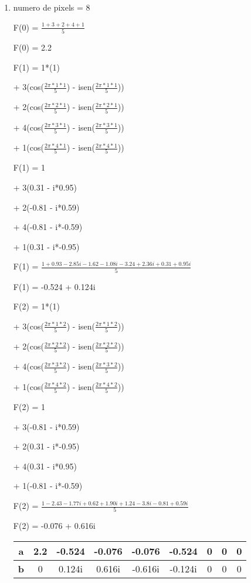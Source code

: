 \begin{question}
\begin{enumerate}[label=\textbf{\alph*})]
  \item 

  numero de pixels = 8

  F(0) = $\frac{1 + 3 + 2 + 4 + 1}{5}$

  F(0) = 2.2

  F(1) = 1*(1) 

  + 3(cos($\frac{2\pi*1*1}{5}$) - isen($\frac{2\pi*1*1}{5}$))
  
  + 2(cos($\frac{2\pi*2*1}{5}$) - isen($\frac{2\pi*2*1}{5}$))

  + 4(cos($\frac{2\pi*3*1}{5}$) - isen($\frac{2\pi*3*1}{5}$))

  + 1(cos($\frac{2\pi*4*1}{5}$) - isen($\frac{2\pi*4*1}{5}$)) 

  F(1) = 1

  + 3(0.31 - i*0.95)
  
  + 2(-0.81 - i*0.59)

  + 4(-0.81 - i*-0.59)

  + 1(0.31 - i*-0.95) 

  F(1) = $\frac{1 + 0.93 - 2.85i -1.62 -1.08i -3.24 + 2.36i + 0.31 +0.95i}{5}$

  F(1) = -0.524 + 0.124i

  F(2) = 1*(1) 

  + 3(cos($\frac{2\pi*1*2}{5}$) - isen($\frac{2\pi*1*2}{5}$))
  
  + 2(cos($\frac{2\pi*2*2}{5}$) - isen($\frac{2\pi*2*2}{5}$))

  + 4(cos($\frac{2\pi*3*2}{5}$) - isen($\frac{2\pi*3*2}{5}$))

  + 1(cos($\frac{2\pi*4*2}{5}$) - isen($\frac{2\pi*4*2}{5}$)) 

  F(2) = 1

  + 3(-0.81 - i*0.59)
  
  + 2(0.31 - i*-0.95) 

  + 4(0.31 - i*0.95)

  + 1(-0.81 - i*-0.59) 

  F(2) = $\frac{1 -2.43 - 1.77i +0.62 +1.90i +1.24 - 3.8i - 0.81 + 0.59i}{5}$

  F(2) = -0.076 + 0.616i

  \begin{table}[ht]
    \centering 
    \begin{tabular}{|c|c|c|c|c|c|c|c|c|}
        \hline
        \textbf{a} & 2.2 & -0.524 & -0.076 & -0.076 & -0.524 & 0 & 0 & 0 \\ 
        \hline
        \textbf{b} & 0 & 0.124i & 0.616i & -0.616i & -0.124i & 0 & 0 & 0 \\ 
        \hline
    \end{tabular}
  \end{table}
  \end{enumerate}


\end{question}